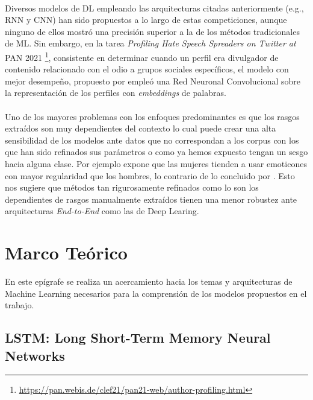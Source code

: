  \\
Diversos modelos de DL empleando las arquitecturas citadas anteriormente (e.g., RNN y CNN) han sido propuestos a lo largo de estas competiciones, aunque ninguno de ellos mostró una precisión superior a la de los métodos tradicionales de ML. Sin embargo, en la tarea \textit{Profiling Hate Speech Spreaders on Twitter at} PAN 2021 \footnote{\url{https://pan.webis.de/clef21/pan21-web/author-profiling.html}}, consistente en determinar cuando un perfil era divulgador de contenido relacionado con el odio a grupos sociales específicos, el modelo con mejor desempeño, propuesto por \citep{sinno:2021} empleó una Red Neuronal Convolucional sobre la representación de los perfiles con \textit{embeddings} de palabras. 
\\\\
Uno de los mayores problemas con los enfoques predominantes es que los rasgos extraídos son muy dependientes del contexto lo cual puede crear una alta sensibilidad de los modelos ante datos que no correspondan a los corpus con los que han sido refinados sus parámetros o como ya hemos expuesto tengan un sesgo hacia alguna clase. Por ejemplo \citep{Newman2008GenderDI} expone que las mujeres tienden a usar emoticones con mayor regularidad que los hombres, lo contrario de lo concluido por \citep{Schwartz2013PersonalityGA}. Esto nos sugiere que métodos tan rigurosamente refinados como lo son los dependientes de rasgos manualmente extraídos tienen una menor robustez ante arquitecturas \textit{End-to-End} como las de Deep Learing.

\section{Marco Teórico}

En este epígrafe se realiza un acercamiento hacia los temas y arquitecturas de Machine Learning necesarios para la comprensión de los modelos propuestos en el trabajo.

\subsection{LSTM: Long Short-Term Memory Neural Networks}

